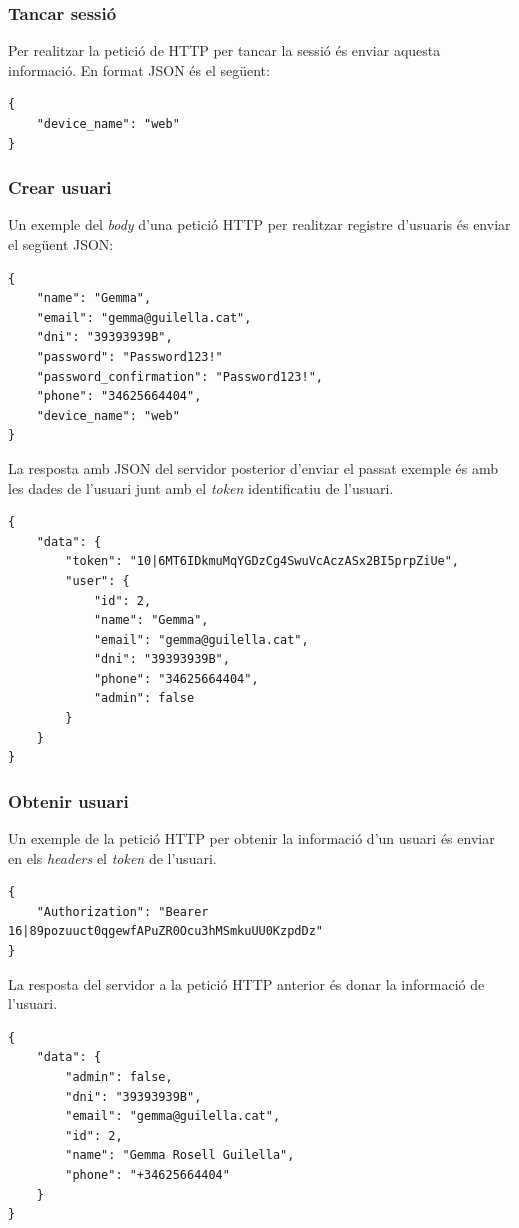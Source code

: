 \subsubsection{Tancar sessió}
\label{sssec:tancar_sessio}

Per realitzar la petició de HTTP per tancar la sessió és enviar aquesta informació.
En format JSON és el següent:
\begin{verbatim}
{
    "device_name": "web"
}
\end{verbatim}


\subsubsection{Crear usuari}
\label{sssec:crear_usuari}

Un exemple del \emph{body} d'una petició HTTP per realitzar registre d'usuaris és enviar
el següent JSON:
\begin{verbatim}
{
    "name": "Gemma",
    "email": "gemma@guilella.cat",
    "dni": "39393939B",
    "password": "Password123!"
    "password_confirmation": "Password123!",
    "phone": "34625664404",
    "device_name": "web"
}
\end{verbatim}

La resposta amb JSON del servidor posterior d'enviar el passat exemple és amb les dades de
l'usuari junt amb el \emph{token} identificatiu de l'usuari.
\begin{verbatim}
{
    "data": {
        "token": "10|6MT6IDkmuMqYGDzCg4SwuVcAczASx2BI5prpZiUe",
        "user": {
            "id": 2,
            "name": "Gemma",
            "email": "gemma@guilella.cat",
            "dni": "39393939B",
            "phone": "34625664404",
            "admin": false
        }
    }
}
\end{verbatim}

\subsubsection{Obtenir usuari}
\label{sssec:obtenir_usuari}

Un exemple de la petició HTTP per obtenir la informació d'un usuari és enviar
en els \emph{headers} el \emph{token} de l'usuari.
\begin{verbatim}
{
    "Authorization": "Bearer 16|89pozuuct0qgewfAPuZR0Ocu3hMSmkuUU0KzpdDz"
}
\end{verbatim}

La resposta del servidor a la petició HTTP anterior és donar la informació
de l'usuari.
\begin{verbatim}
{
    "data": {
        "admin": false,
        "dni": "39393939B",
        "email": "gemma@guilella.cat",
        "id": 2,
        "name": "Gemma Rosell Guilella",
        "phone": "+34625664404"
    }
}
\end{verbatim}



